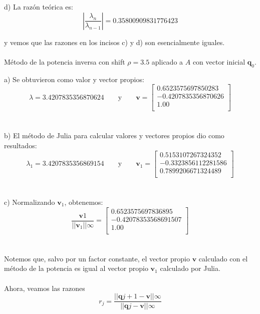 \documentclass[11pt]{article}
\begin{document}
d) La razón teórica es:
$$
\left| \frac{\lambda_n}{\lambda_{n-1}} \right| = 0.35800909831776423
$$

y vemos que las razones en los incisos c) y d) son esencialmente iguales.
\\
\\

\noindent
Método de la potencia inversa con shift $\rho = 3.5$ aplicado a $A$ con vector inicial $\textbf{q}_0$.

a) Se obtuvieron como valor y vector propios:
 \[
 \lambda = 3.4207835356870624
 \qquad\text{y}\qquad
 \textbf{v} = \begin{bmatrix}
0.6523575697850283 \\
-0.4207835356870626\\
1.00 \\
\end{bmatrix}
 \]
 \\
 \\

b) El método de Julia para calcular valores y vectores propios dio como resultados:
\[
 \lambda_1 = 3.4207835356869154
 \qquad\text{y}\qquad
 \textbf{v}_1 = \begin{bmatrix}
0.5153107267324352 \\
-0.3323856112281586 \\
0.7899206671324489 \\
\end{bmatrix}
 \]
 \\
 \\

 c) Normalizando $\textbf{v}_1$, obtenemos:
 $$\frac{\textbf{v}1}{||\textbf{v}_1||\infty} =
\begin{bmatrix}
0.6523575697836895 \\
-0.42078353568691507 \\
1.00 \\
\end{bmatrix}$$
\\
\\

Notemos que, salvo por un factor constante, el vector propio $\textbf{v}$ calculado con el método de la potencia es igual al vector propio $\textbf{v}_1$ calculado por Julia.
\\
\\

Ahora, veamos las razones
$$
r_j = \frac{||\textbf{q}{j+1} - \textbf{v}||\infty}{||\textbf{q}{j} - \textbf{v}||\infty}
$$
\\
\end{document}
